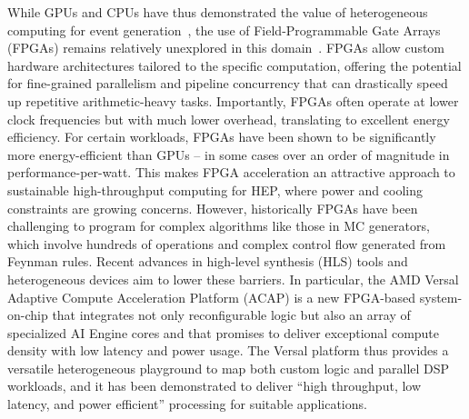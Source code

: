 While GPUs and CPUs have thus demonstrated the value of heterogeneous computing for event generation~\cite{Carrazza:2021gpx}, the use of Field-Programmable Gate Arrays (FPGAs) remains relatively unexplored in this domain~\cite{Barbone:2023mul}. FPGAs allow custom hardware architectures tailored to the specific computation, offering the potential for fine-grained parallelism and pipeline concurrency that can drastically speed up repetitive arithmetic-heavy tasks. Importantly, FPGAs often operate at lower clock frequencies but with much lower overhead, translating to excellent energy efficiency. For certain workloads, FPGAs have been shown to be significantly more energy-efficient than GPUs – in some cases over an order of magnitude in performance-per-watt. This makes FPGA acceleration an attractive approach to sustainable high-throughput computing for HEP, where power and cooling constraints are growing concerns. However, historically FPGAs have been challenging to program for complex algorithms like those in MC generators, which involve hundreds of operations and complex control flow generated from Feynman rules. Recent advances in high-level synthesis (HLS) tools and heterogeneous devices aim to lower these barriers. In particular, the AMD Versal Adaptive Compute Acceleration Platform (ACAP) is a new FPGA-based system-on-chip that integrates not only reconfigurable logic but also an array of specialized AI Engine cores and that promises to deliver exceptional compute density with low latency and power usage. The Versal platform thus provides a versatile heterogeneous playground to map both custom logic and parallel DSP workloads, and it has been demonstrated to deliver ``high throughput, low latency, and power efficient'' processing for suitable applications. 